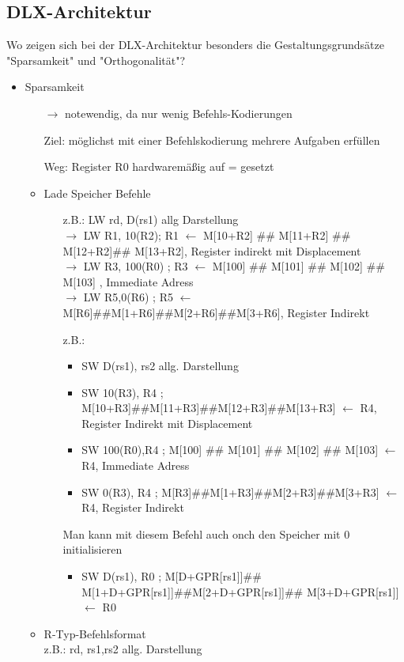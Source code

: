 \subsection{DLX-Architektur}
Wo zeigen sich bei der DLX-Architektur besonders die Gestaltungsgrundsätze "Sparsamkeit" und "Orthogonalität"?
\begin{itemize}
	\item Sparsamkeit
	\begin{itemize}
		\item[$\to$] notewendig, da nur wenig Befehls-Kodierungen
		\item[Ziel:] möglichst mit einer Befehlskodierung mehrere Aufgaben erfüllen
		\item[Weg:] Register R0 hardwaremäßig auf = gesetzt
		\item Lade Speicher Befehle
		\begin{itemize}
			\item[z.B.:] LW rd, D(rs1) allg Darstellung \\ $\to$ LW R1, 10(R2); R1 $\leftarrow$ M[10+R2] \#\# M[11+R2] \#\# M[12+R2]\#\# M[13+R2],  Register indirekt mit Displacement \\ $\to$ LW R3, 100(R0) ; R3 $\leftarrow$ M[100] \#\# M[101] \#\# M[102] \#\# M[103] , Immediate Adress\\
			$\to$ LW R5,0(R6) ; R5 $\leftarrow$ M[R6]\#\#M[1+R6]\#\#M[2+R6]\#\#M[3+R6], Register Indirekt
			\item[z.B.:]
			\begin{itemize}
				\item SW D(rs1), rs2 allg. Darstellung
				\item SW 10(R3), R4 ; M[10+R3]\#\#M[11+R3]\#\#M[12+R3]\#\#M[13+R3] $\leftarrow$ R4, Register Indirekt mit Displacement
				\item SW 100(R0),R4 ;  M[100] \#\# M[101] \#\# M[102] \#\# M[103] $\leftarrow$ R4, Immediate Adress
				\item SW 0(R3), R4 ; M[R3]\#\#M[1+R3]\#\#M[2+R3]\#\#M[3+R3] $\leftarrow$ R4, Register Indirekt
			\end{itemize}
			Man kann mit diesem Befehl auch onch den Speicher mit 0 initialisieren
			\begin{itemize}
				\item SW D(rs1), R0 ; M[D+GPR[rs1]]\#\# M[1+D+GPR[rs1]]\#\#M[2+D+GPR[rs1]]\#\# M[3+D+GPR[rs1]] $\leftarrow$ R0
			\end{itemize}
		\end{itemize}
		\item R-Typ-Befehlsformat\\ z.B.: rd, rs1,rs2 allg. Darstellung

\end{itemize}
\end{itemize}
